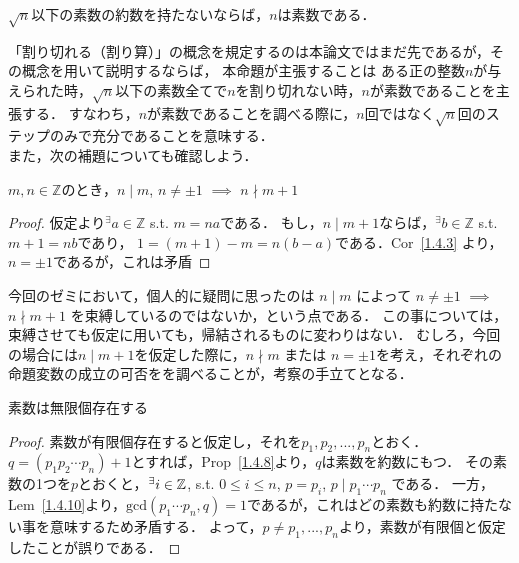     \begin{prop} \label{1.4.9.1}
      $\sqrt{n}$以下の素数の約数を持たないならば，$n$は素数である．
    \end{prop}

    「割り切れる（割り算）」の概念を規定するのは本論文ではまだ先であるが，その概念を用いて説明するならば，
    本命題が主張することは ある正の整数$n$が与えられた時，$\sqrt{n}$以下の素数全てで$n$を割り切れない時，$n$が素数であることを主張する．
    すなわち，$n$が素数であることを調べる際に，$n$回ではなく$\sqrt{n}$回のステップのみで充分であることを意味する． \\

    また，次の補題についても確認しよう．

    \begin{lem} \label{1.4.10}
      $m, n \in \mathbb{Z}$のとき，$n \mid m$, $n \neq \pm 1$ $\implies$ $n \nmid m + 1$
    \end{lem}

    \begin{proof}
      仮定より$^{\exists}a \in \mathbb{Z}$ s.t. $m = na$である．
      もし，$n \mid m+1$ならば，$^{\exists}b \in \mathbb{Z}$ s.t. $m+1 = nb$であり，
      $1 = (m+1)-m = n(b-a)$である．Cor~\ref{1.4.3} より，$n = \pm 1$であるが，これは矛盾
    \end{proof}

    今回のゼミにおいて，個人的に疑問に思ったのは $n \mid m$ によって $n \neq \pm 1$ $\implies$ $n \nmid m + 1$ を束縛しているのではないか，という点である．
    この事については，束縛させても仮定に用いても，帰結されるものに変わりはない．
    むしろ，今回の場合には$n \mid m+1$を仮定した際に，$n \nmid m$ または $n = \pm 1$を考え，それぞれの命題変数の成立の可否をを調べることが，考察の手立てとなる．

    \begin{prop} \label{1.4.11}
      素数は無限個存在する
    \end{prop}

    \begin{proof}
      素数が有限個存在すると仮定し，それを$p_1, p_2, ... , p_n $とおく．
      $q=(p_1 p_2 \cdots p_n) + 1$とすれば，Prop~\ref{1.4.8}より，$q$は素数を約数にもつ．
      その素数の1つを$p$とおくと，$^{\exists}i \in \mathbb{Z}$, s.t. $0 \leq i \leq n$, $p = p_i$, $p \mid p_1 \cdots p_n$ である．
      一方，Lem~\ref{1.4.10}より，$\mathrm{gcd} (p_1 \cdots p_n, q)=1$であるが，これはどの素数も約数に持たない事を意味するため矛盾する．
      よって，$p \neq p_1, ... , p_n$より，素数が有限個と仮定したことが誤りである．
    \end{proof}

